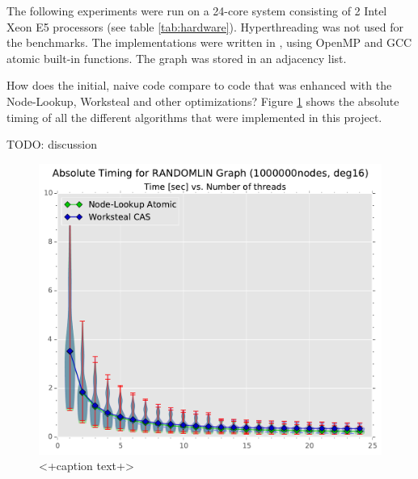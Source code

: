 The following experiments were run on a 24-core system consisting of 2 Intel Xeon E5 processors (see table \ref{tab:hardware}).
Hyperthreading was not used for the benchmarks.
The implementations were written in \Cpp, using OpenMP and GCC atomic built-in functions. The graph was stored in an adjacency list.



How does the initial, naive code compare to code that was enhanced with the Node-Lookup, Worksteal and other optimizations?
Figure \ref{fig:abstiming} shows the absolute timing of all the different algorithms that were implemented in this project.
\par\medskip
{\Large TODO: discussion}
\par\medskip
%
\begin{figure}[ht]
	\centering
	\includegraphics[width=\columnwidth]{plots/abstiming_gtRANDOMLIN_n1000000_deg16.pdf}
	\caption{<+caption text+>}
	\label{fig:abstiming}
\end{figure}


